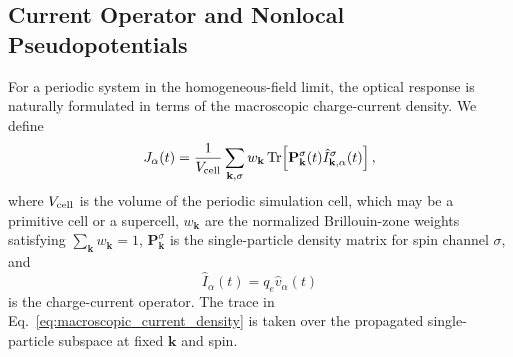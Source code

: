 \subsection{Current Operator and Nonlocal Pseudopotentials}
\label{sec:current-nlpp}

For a periodic system in the homogeneous-field limit, the optical
response is naturally formulated in terms of the macroscopic
charge-current density.  We define
\begin{equation}
  J_\alpha(t)
  =
  \frac{1}{V_{\rm cell}}
  \sum_{\mathbf k,\sigma}
  w_{\mathbf k}\,
  {\rm Tr}\!
  \left[
    \mathbf P_{\mathbf k}^{\sigma}(t)
    \hat I_{\mathbf k,\alpha}^{\sigma}(t)
  \right],
  \label{eq:macroscopic_current_density}
\end{equation}
where $V_{\rm cell}$ is the volume of the periodic simulation cell,
which may be a primitive cell or a supercell, $w_{\mathbf k}$ are the
normalized Brillouin-zone weights satisfying
$\sum_{\mathbf k}w_{\mathbf k}=1$, $\mathbf P_{\mathbf k}^{\sigma}$ is
the single-particle density matrix for spin channel $\sigma$, and
\begin{equation}
  \hat I_\alpha(t)=q_e\hat v_\alpha(t)
  \label{eq:charge_current_operator_definition}
\end{equation}
is the charge-current operator.  The trace in
Eq.~\eqref{eq:macroscopic_current_density} is taken over the propagated
single-particle subspace at fixed $\mathbf k$ and spin.


